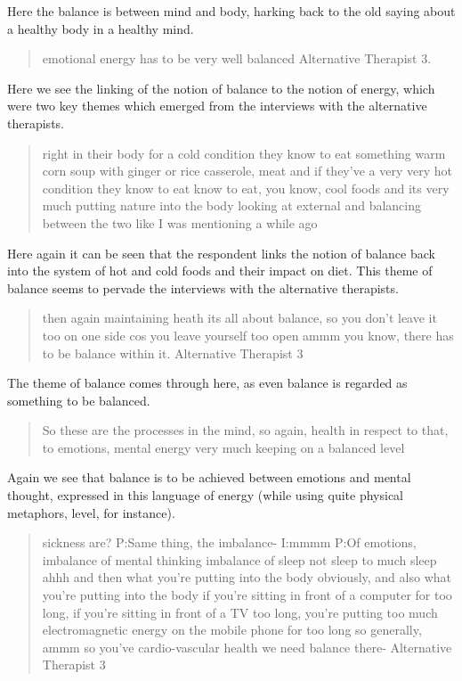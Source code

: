 Here the balance is between mind and body, harking back to the old saying about a healthy body in a healthy mind. 


\begin{quotation}
  emotional energy has to be very well balanced
Alternative Therapist 3.
\end{quotation}

Here we see the linking of the notion of balance to the notion of energy, which were two key themes which emerged from the interviews with the alternative therapists. 

\begin{quotation}
  right in their body for a cold condition they know to eat something warm corn soup with ginger or rice casserole, meat and if they've a very very hot condition they know to eat know to eat, you know, cool foods and its very much putting nature into the body looking at external and balancing between the two like I was mentioning a while ago

\end{quotation}

Here again it can be seen that the respondent links the notion of balance back into the system of hot and cold foods and their impact on diet. This theme of balance seems to pervade the interviews with the alternative therapists. 

\begin{quotation}
then again maintaining heath its all about balance, so you don't leave it too on one side cos you leave yourself too open ammm you know, there has to be balance within it.
Alternative Therapist 3
\end{quotation}

The theme of balance comes through here, as even balance is regarded as something to be balanced. 


\begin{quotation}
   So these are the processes in the mind, so again, health in respect to that, to emotions, mental energy very much keeping on a balanced level

\end{quotation}

Again we see that balance is to be achieved between emotions and mental thought, expressed in this language of energy (while using quite physical metaphors, level, for instance). 

\begin{quotation}
  sickness are?
P:Same thing, the imbalance-
I:mmmm
P:Of emotions, imbalance of mental thinking imbalance of sleep not sleep to much sleep ahhh and then what you're putting into the body obviously, and also what you're putting into the body if you're sitting in front of a computer for too long, if you're sitting in front of a TV too long, you're putting too much electromagnetic energy on the mobile phone for too long so generally, ammm so you've cardio-vascular health we need balance there-
Alternative Therapist 3
\end{quotation}

